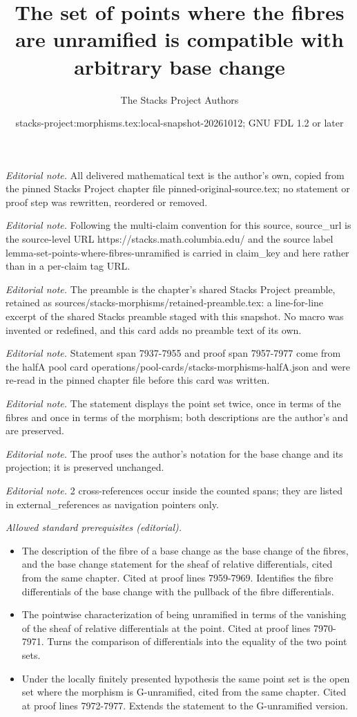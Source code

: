 \documentclass[10pt,a4paper]{amsart}
\title{The set of points where the fibres are unramified is compatible with arbitrary base change}
\author{The Stacks Project Authors}
\date{stacks-project:morphisms.tex:local-snapshot-20261012; GNU FDL 1.2 or later}
\theoremstyle{plain}
\theoremstyle{definition}
\theoremstyle{remark}
\numberwithin{equation}{subsection}
\begin{document}
\maketitle
\noindent\textit{Editorial note.} All delivered mathematical text is the author's own, copied from the pinned Stacks Project chapter file pinned-original-source.tex; no statement or proof step was rewritten, reordered or removed.\par\medskip
\noindent\textit{Editorial note.} Following the multi-claim convention for this source, source\_url is the source-level URL https://stacks.math.columbia.edu/ and the source label lemma-set-points-where-fibres-unramified is carried in claim\_key and here rather than in a per-claim tag URL.\par\medskip
\noindent\textit{Editorial note.} The preamble is the chapter's shared Stacks Project preamble, retained as sources/stacks-morphisms/retained-preamble.tex: a line-for-line excerpt of the shared Stacks preamble staged with this snapshot. No macro was invented or redefined, and this card adds no preamble text of its own.\par\medskip
\noindent\textit{Editorial note.} Statement span 7937-7955 and proof span 7957-7977 come from the halfA pool card operations/pool-cards/stacks-morphisms-halfA.json and were re-read in the pinned chapter file before this card was written.\par\medskip
\noindent\textit{Editorial note.} The statement displays the point set twice, once in terms of the fibres and once in terms of the morphism; both descriptions are the author's and are preserved.\par\medskip
\noindent\textit{Editorial note.} The proof uses the author's notation for the base change and its projection; it is preserved unchanged.\par\medskip
\noindent\textit{Editorial note.} 2 cross-references occur inside the counted spans; they are listed in external\_references as navigation pointers only.\par\medskip
\noindent\textit{Allowed standard prerequisites (editorial).}\begin{itemize}
\item The description of the fibre of a base change as the base change of the fibres, and the base change statement for the sheaf of relative differentials, cited from the same chapter. Cited at proof lines 7959-7969. Identifies the fibre differentials of the base change with the pullback of the fibre differentials.
\item The pointwise characterization of being unramified in terms of the vanishing of the sheaf of relative differentials at the point. Cited at proof lines 7970-7971. Turns the comparison of differentials into the equality of the two point sets.
\item Under the locally finitely presented hypothesis the same point set is the open set where the morphism is G-unramified, cited from the same chapter. Cited at proof lines 7972-7977. Extends the statement to the G-unramified version.
\end{itemize}\medskip
\end{document}
